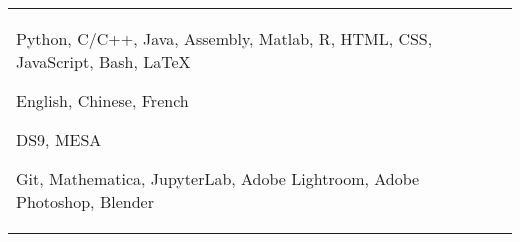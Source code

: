 \begin{paracol}{1}
\begin{tabular}{L{4cm}@{\hskip 0.3in}L{13cm}}
                   {Python, C/C++, Java, Assembly, Matlab, R, HTML, CSS, JavaScript, Bash, \LaTeX} %
                   {} %
                   {} %
                   {}
                   {}

                                  {English, Chinese, French} %
                                  {} %
                                  {} %
                                  {} %
                                  {}

                                                 {DS9, MESA} %
                                                 {} %
                                                 {} %
                                                 {} %
                                                 {}


                                                                {Git, Mathematica, JupyterLab, Adobe Lightroom, Adobe Photoshop, Blender} %
                                                                {} %
                                                                {} %
                                                                {} %
                                                                {}
  \end{tabular}



\end{paracol}
